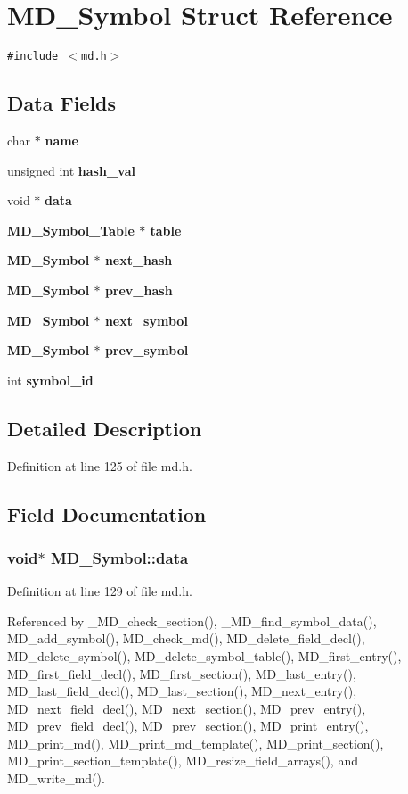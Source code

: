 \section{MD\_\-Symbol Struct Reference}
\label{structMD__Symbol}
{\tt \#include $<$md.h$>$}

\subsection*{Data Fields}
\begin{CompactItemize}
\item 
char $\ast$ \bf{name}
\item 
unsigned int \bf{hash\_\-val}
\item 
void $\ast$ \bf{data}
\item 
\bf{MD\_\-Symbol\_\-Table} $\ast$ \bf{table}
\item 
\bf{MD\_\-Symbol} $\ast$ \bf{next\_\-hash}
\item 
\bf{MD\_\-Symbol} $\ast$ \bf{prev\_\-hash}
\item 
\bf{MD\_\-Symbol} $\ast$ \bf{next\_\-symbol}
\item 
\bf{MD\_\-Symbol} $\ast$ \bf{prev\_\-symbol}
\item 
int \bf{symbol\_\-id}
\end{CompactItemize}


\subsection{Detailed Description}




Definition at line 125 of file md.h.

\subsection{Field Documentation}
\subsubsection{\setlength{\rightskip}{0pt plus 5cm}void$\ast$ \bf{MD\_\-Symbol::data}}\label{structMD__Symbol_30e630b8b92c43bd898b88d7dc7cceb3}




Definition at line 129 of file md.h.

Referenced by \_\-MD\_\-check\_\-section(), \_\-MD\_\-find\_\-symbol\_\-data(), MD\_\-add\_\-symbol(), MD\_\-check\_\-md(), MD\_\-delete\_\-field\_\-decl(), MD\_\-delete\_\-symbol(), MD\_\-delete\_\-symbol\_\-table(), MD\_\-first\_\-entry(), MD\_\-first\_\-field\_\-decl(), MD\_\-first\_\-section(), MD\_\-last\_\-entry(), MD\_\-last\_\-field\_\-decl(), MD\_\-last\_\-section(), MD\_\-next\_\-entry(), MD\_\-next\_\-field\_\-decl(), MD\_\-next\_\-section(), MD\_\-prev\_\-entry(), MD\_\-prev\_\-field\_\-decl(), MD\_\-prev\_\-section(), MD\_\-print\_\-entry(), MD\_\-print\_\-md(), MD\_\-print\_\-md\_\-template(), MD\_\-print\_\-section(), MD\_\-print\_\-section\_\-template(), MD\_\-resize\_\-field\_\-arrays(), and MD\_\-write\_\-md().
